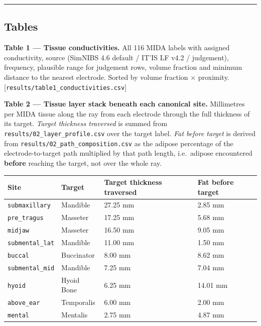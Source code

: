 \documentclass[
  11pt,
]{article}
\newcounter{none} %
\begin{document}
\begin{center}\rule{0.5\linewidth}{0.5pt}\end{center}

\subsection{Tables}\label{tables}

\textbf{Table 1 --- Tissue conductivities.} All 116 MIDA labels with assigned
conductivity, source (SimNIBS 4.6 default / IT'IS LF v4.2 / judgement),
frequency, plausible range for judgement rows, volume fraction and minimum
distance to the nearest electrode. Sorted by volume fraction \(\times\) proximity.
{[}\texttt{results/table1\_conductivities.csv}{]}

\textbf{Table 2 --- Tissue layer stack beneath each canonical site.} Millimetres per
MIDA tissue along the ray from each electrode through the full thickness of its
target. \emph{Target thickness traversed} is summed from \texttt{results/02\_layer\_profile.csv}
over the target label. \emph{Fat before target} is derived from
\texttt{results/02\_path\_composition.csv} as the adipose percentage of the
electrode-to-target path multiplied by that path length, i.e.~adipose
encountered \textbf{before} reaching the target, not over the whole ray.

{\def\LTcaptype{none} %
\begin{longtable}[]{@{}llll@{}}
\toprule\noalign{}
Site & Target & Target thickness traversed & Fat before target \\
\midrule\noalign{}
\endhead
\bottomrule\noalign{}
\endlastfoot
\texttt{submaxillary} & Mandible & 27.25 mm & 2.85 mm \\
\texttt{pre\_tragus} & Masseter & 17.25 mm & 5.68 mm \\
\texttt{midjaw} & Masseter & 16.50 mm & 9.05 mm \\
\texttt{submental\_lat} & Mandible & 11.00 mm & 1.50 mm \\
\texttt{buccal} & Buccinator & 8.00 mm & 8.62 mm \\
\texttt{submental\_mid} & Mandible & 7.25 mm & 7.04 mm \\
\texttt{hyoid} & Hyoid Bone & 6.25 mm & 14.01 mm \\
\texttt{above\_ear} & Temporalis & 6.00 mm & 2.00 mm \\
\texttt{mental} & Mentalis & 2.75 mm & 4.87 mm \\
\end{longtable}
}
\end{document}
